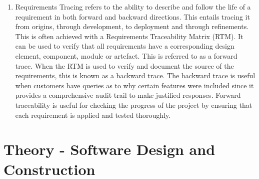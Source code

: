 \documentclass{article}
\begin{document}
\begin{enumerate}
    \item	Requirements Tracing refers to the ability to describe and follow the life of a requirement in both forward and backward directions. This entails tracing it from origins, through development, to deployment and through refinements. This is often achieved with a Requirements Traceability Matrix (RTM). It can be used to verify that all requirements have a corresponding design element, component, module or artefact. This is referred to as a forward trace. When the RTM is used to verify and document the source of the requirements, this is known as a backward trace. The backward trace is useful when customers have queries as to why certain features were included since it provides a comprehensive audit trail to make justified responses. Forward traceability is useful for checking the progress of the project by ensuring that each requirement is applied and tested thoroughly.


\end{enumerate}


\section{Theory - Software Design and Construction}
\end{document}

